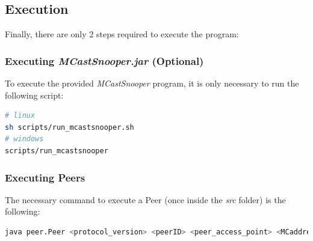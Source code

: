 \documentclass[a4paper]{article}
\begin{document}
    \subsection{Execution}
    
        Finally, there are only 2 steps required to execute the program:
        
        \subsubsection*{Executing \textit{MCastSnooper.jar} (Optional)}
        
            To execute the provided \textit{MCastSnooper} program, it is only necessary to run the following script:
        
\begin{lstlisting}[language=Bash, caption=Executing \textit{MCastSnooper} Scripts]
# linux
sh scripts/run_mcastsnooper.sh
# windows
scripts/run_mcastsnooper
\end{lstlisting}
        
        \subsubsection*{Executing Peers}
        
            The necessary command to execute a Peer (once inside the \textit{src} folder) is the following:
    
\begin{lstlisting}[language=Bash, caption=Executing \textit{Peer} Program]
java peer.Peer <protocol_version> <peerID> <peer_access_point> <MCaddress> <MCport> <MDBaddress> <MDBport> <MDRaddress> <MDRport>
\end{lstlisting}
\end{document}
